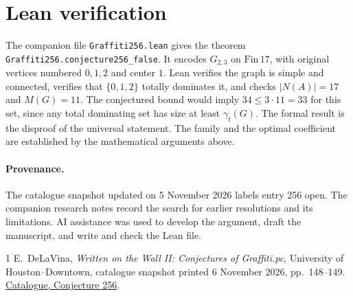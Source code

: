 \documentclass[11pt]{article}
\newcommand{\gt}{\gamma_t}
\begin{document}
\section{Lean verification}

The companion file \texttt{Graffiti256.lean} gives the theorem
\texttt{Graffiti256.conjecture256\_false}. It encodes \(G_{2,3}\) on
\(\mathrm{Fin}\,17\), with original vertices numbered \(0,1,2\) and
center \(1\). Lean verifies the graph is simple and connected, verifies
that \(\{0,1,2\}\) totally dominates it, and checks
\(|N(A)|=17\) and \(M(G)=11\). The conjectured bound would imply
\(34\le 3\cdot11=33\) for this set, since any total dominating set
has size at least \(\gt(G)\). The formal result is the disproof of the
universal statement. The family and the optimal coefficient are
established by the mathematical arguments above.

\paragraph{Provenance.}
The catalogue snapshot updated on 5 November 2026 labels entry 256
open. The companion research notes record the search for earlier
resolutions and its limitations. AI assistance was used to develop
the argument, draft the manuscript, and write and check the Lean file.

\begin{thebibliography}{1}
E.~DeLaVina, \emph{Written on the Wall II: Conjectures of Graffiti.pc},
University of Houston--Downtown, catalogue snapshot printed
6 November 2026, pp.~148--149.
\href{https://www.uhd.edu/academics/sciences/mathematics-statistics/wowii/files/wowiiaii.pdf#page=149}{Catalogue, Conjecture 256}.
\end{thebibliography}
\end{document}
